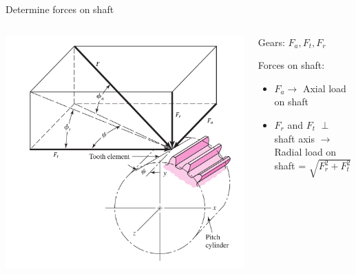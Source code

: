 \documentclass[10pt, svgnames]{beamer}
\begin{document}
\begin{frame}[label={sec:org50585c4}]{Determine forces on shaft}
\begin{columns}
\begin{column}{0.5\columnwidth}
\begin{center}
\includegraphics[width=\textwidth]{./pictures/helical-gear-forces.png}
\end{center}
\end{column}

\begin{column}{0.5\columnwidth}
Gears: \(F_{a}, F_{t}, F_{r}\)

Forces on shaft:

\begin{itemize}
\item \(F_{a} \rightarrow\) Axial load on shaft
\item \(F_{r}\) and \(F_{t}\) \(\perp\) shaft axis \(\rightarrow\) Radial load on shaft = \(\sqrt{F_r^{2} + F_t^{2}}\)
\end{itemize}
\end{column}
\end{columns}
\end{frame}
\end{document}
